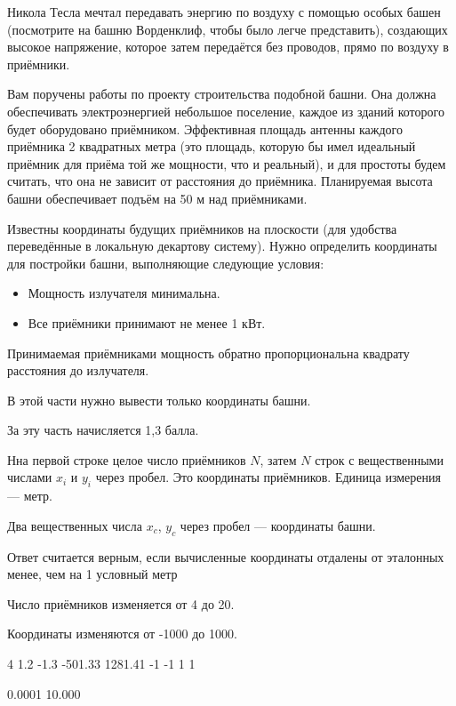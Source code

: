 
Никола Тесла мечтал передавать энергию по воздуху с помощью особых башен (посмотрите на башню Ворденклиф, чтобы было легче представить), создающих высокое напряжение, которое затем передаётся без проводов, прямо по воздуху в приёмники.

Вам поручены работы по проекту строительства подобной башни. Она должна обеспечивать электроэнергией небольшое поселение, каждое из зданий которого будет оборудовано приёмником. Эффективная площадь антенны каждого приёмника 2 квадратных метра (это площадь, которую бы имел идеальный приёмник для приёма той же мощности, что и реальный), и для простоты будем считать, что она не зависит от расстояния до приёмника. Планируемая высота башни обеспечивает подъём на 50 м над приёмниками.

Известны координаты будущих приёмников на плоскости (для удобства переведённые в локальную декартову систему). Нужно определить координаты для постройки башни, выполняющие следующие условия: 

\begin{itemize}
    \item Мощность излучателя минимальна.
    \item Все приёмники принимают не менее 1 кВт.
\end{itemize}

Принимаемая приёмниками мощность обратно пропорциональна квадрату расстояния до излучателя.

В этой части нужно вывести только координаты башни.

За эту часть начисляется 1,3 балла.


Нна первой строке целое число приёмников $N$, затем $N$ строк с вещественными числами 
$x_i$ и $y_i$ через пробел. Это координаты приёмников. Единица измерения — метр.

\outputfmtSection

Два вещественных числа $x_c$, $y_c$ через пробел — координаты башни.

Ответ считается верным, если вычисленные координаты отдалены от эталонных менее, чем на 1 условный метр

Число приёмников изменяется от 4 до 20.

Координаты изменяются от -1000 до 1000.

\begin{myverbbox}[\small]{\vinput}
    4
    1.2 -1.3
    -501.33 1281.41
    -1 -1
    1 1
\end{myverbbox}
\begin{myverbbox}[\small]{\voutput}
    0.0001 10.000
\end{myverbbox}


